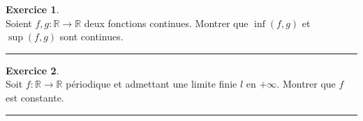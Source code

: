 \documentclass[a4paper,11pt]{article}
\theoremstyle{definition}
\newtheorem{exo}{Exercice} %
\begin{document}
\begin{exo}\textit{}\quad\\[0.25cm]
	Soient $f,g:\mathbb R\to\mathbb R$ deux fonctions continues.
	Montrer que $\inf(f,g)$ et $\sup(f,g)$ sont continues.
	
	
	\centering
	\rule{1\linewidth}{0.6pt}
\end{exo}


\begin{exo}\textit{}\quad\\[0.25cm]
	Soit $f:\mathbb R\to\mathbb R$ périodique et admettant une limite finie $l$ en $+\infty$. Montrer que $f$ est constante.
	
	
	\centering
	\rule{1\linewidth}{0.6pt}
\end{exo}	
		
\end{document}
